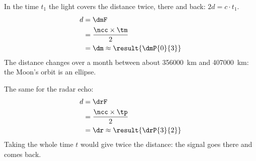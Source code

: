 \begin{abcliste}
\abc In the time $t_1$ the light covers the distance twice, there and back: $2d = c\cdot t_1$.
\begin{align}
 d &= \dmF \\
   &= \frac{\ncc\times\tm}{2} \\
   &= \dm \approx \result{\dmP{0}{3}}
\end{align}
The distance changes over a month between about \SI{356000}{\km} and \SI{407000}{\km}: the Moon's orbit is an ellipse.

\abc The same for the radar echo:
\begin{align}
 d &= \drF \\
   &= \frac{\ncc\times\tp}{2} \\
   &= \dr \approx \result{\drP{3}{2}}
\end{align}
Taking the whole time $t$ would give twice the distance: the signal goes there and comes back.
\end{abcliste}
